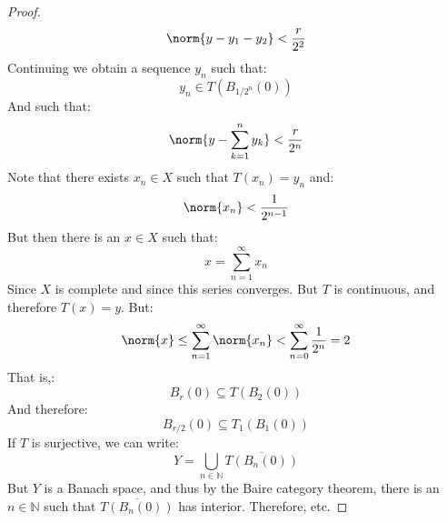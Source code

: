 \begin{proof}
\begin{equation}
                \norm{y-y_{1}-y_{2}}<\frac{r}{2^{2}}
            \end{equation}
            Continuing we obtain a sequence $y_{n}$ such that:
            \begin{equation}
                y_{n}\in{T}(B_{1/2^{n}}(0))
            \end{equation}
            And such that:
            \begin{equation}
                \norm{y-\sum_{k=1}^{n}y_{k}}<
                \frac{r}{2^{n}}
            \end{equation}
            Note that there exists $x_{n}\in{X}$ such that
            $T(x_{n})=y_{n}$ and:
            \begin{equation}
                \norm{x_{n}}<\frac{1}{2^{n-1}}
            \end{equation}
            But then there is an $x\in{X}$ such that:
            \begin{equation}
                x=\sum_{n=1}^{\infty}x_{n}
            \end{equation}
            Since $X$ is complete and since this series converges.
            But $T$ is continuous, and therefore $T(x)=y$. But:
            \begin{equation}
                \norm{x}\leq\sum_{n=1}^{\infty}\norm{x_{n}}
                <\sum_{n=0}^{\infty}\frac{1}{2^{n}}=2
            \end{equation}
            That is,:
            \begin{equation}
                B_{r}(0)\subseteq{T}(B_{2}(0))
            \end{equation}
            And therefore:
            \begin{equation}
                B_{r/2}(0)\subseteq
                T_{1}(B_{1}(0))
            \end{equation}
            If $T$ is surjective, we can write:
            \begin{equation}
                Y=\bigcup_{n\in\mathbb{N}}
                \overline{T(B_{n}(0))}
            \end{equation}
            But $Y$ is a Banach space, and thus by the Baire
            category theorem, there is an $n\in\mathbb{N}$ such
            that $\overline{T(B_{n}(0))}$ has interior. Therefore,
            etc.
        \end{proof}
